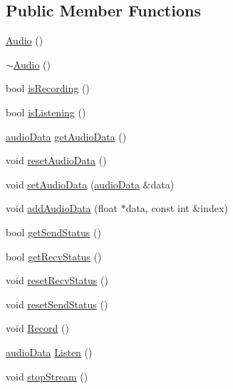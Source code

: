 \subsection*{Public Member Functions}
\begin{DoxyCompactItemize}
\item 
\hyperlink{classBabel_1_1audio_1_1Audio_a90c98f286b6f32b71691ca21b6373a74}{Audio} ()
\item 
\hyperlink{classBabel_1_1audio_1_1Audio_a4a797fd4a1d704f50e4e573f7a3f1780}{$\sim$\+Audio} ()
\item 
bool \hyperlink{classBabel_1_1audio_1_1Audio_ae05b545cad9e1db811dc3a27bb7fd7d8}{is\+Recording} ()
\item 
bool \hyperlink{classBabel_1_1audio_1_1Audio_a7491f94ee8a8bac6603727e29919cd12}{is\+Listening} ()
\item 
\hyperlink{structaudioData}{audio\+Data} \hyperlink{classBabel_1_1audio_1_1Audio_af71d8ca6c102c890c45db9af41f70a2d}{get\+Audio\+Data} ()
\item 
void \hyperlink{classBabel_1_1audio_1_1Audio_a6b50d630ceea9a41088c3e5f8f4694f6}{reset\+Audio\+Data} ()
\item 
void \hyperlink{classBabel_1_1audio_1_1Audio_aed1e83c0c55e57cf785657f3988fccd1}{set\+Audio\+Data} (\hyperlink{structaudioData}{audio\+Data} \&data)
\item 
void \hyperlink{classBabel_1_1audio_1_1Audio_a607a00b8286e3b80a4b0db7e4087671a}{add\+Audio\+Data} (float $\ast$data, const int \&index)
\item 
bool \hyperlink{classBabel_1_1audio_1_1Audio_afb3a0176f9f575c6f13a85ca1b92f375}{get\+Send\+Status} ()
\item 
bool \hyperlink{classBabel_1_1audio_1_1Audio_a9977bd57a40c49f0a03351bf1866da48}{get\+Recv\+Status} ()
\item 
void \hyperlink{classBabel_1_1audio_1_1Audio_a4d66042877979c713c9e20915b48d2d4}{reset\+Recv\+Status} ()
\item 
void \hyperlink{classBabel_1_1audio_1_1Audio_ab14103faf465d65eab05f70a53d6ce67}{reset\+Send\+Status} ()
\item 
void \hyperlink{classBabel_1_1audio_1_1Audio_a5a3398e6f3dc876748d6c35f2b8cf437}{Record} ()
\item 
\hyperlink{structaudioData}{audio\+Data} \hyperlink{classBabel_1_1audio_1_1Audio_a002b91e9a4c7806f4e29fd2943a11918}{Listen} ()
\item 
void \hyperlink{classBabel_1_1audio_1_1Audio_a8e56e50b051bc6b92ab7afc66e99989b}{stop\+Stream} ()
\end{DoxyCompactItemize}


